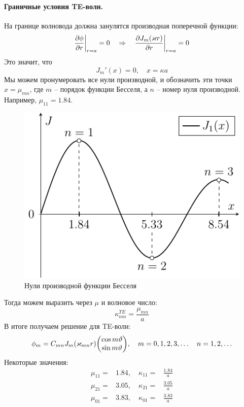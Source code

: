 \paragraph{Граничные условия TE-волн.} На границе волновода должна занулятся производная поперечной функции:
\begin{equation}
	\pdv{\phi}{r}\bigg|_{r=a}=0 \quad \Rightarrow \quad \pdv{J_m(\varkappa r)}{r}\bigg|_{r=a}=0
\end{equation}
Это значит, что
\begin{equation}
	J_m'(x)=0, \quad x=\kappa a
\end{equation}
Мы можем пронумеровать все нули производной, и обозначить эти точки $x=\mu_{mn}$, где $m$ -- порядок функции Бесселя, а $n$ -- номер нуля производной. Например, $\mu_{11}=1.84$. 
\begin{figure}[H]
	\centering
	\includegraphics[scale=1.4]{img_lect5/bessel/bessel_mu}
	\caption{Нули производной функции Бесселя}
	\label{fig:cylinder:besselN}
\end{figure}
Тогда можем выразить через $\mu$ и волновое число:
\begin{equation}
	\kappa_{mn}^{TE}=\frac{\mu_{mn}}{a}
\end{equation}
В итоге получаем решение для TE-волн:
\begin{equation}
	\phi_m=C_{mn} J_m(\kappa_{mn} r)\mqty(\cos m\vartheta \\\sin m\vartheta), \quad
	m=0,1,2,3,\ldots \quad n=1,2,\ldots
\end{equation}
Некоторые значения:
\begin{equation}
\begin{aligned}
 		\mu_{11}=&1.84, \quad \kappa_{11}=&\frac{1.84}{a}\\[0.7em]
 		\mu_{21}=&3.05, \quad \kappa_{21}=&\frac{3.05}{a}\\[0.7em]
 		\mu_{01}=&3.83, \quad \kappa_{01}=&\frac{3.83}{a}
\end{aligned} 	
\end{equation} 
